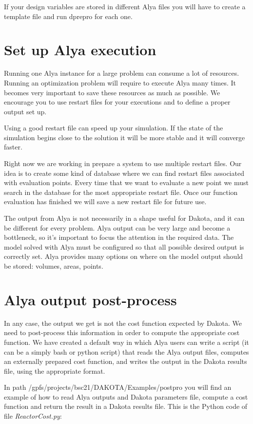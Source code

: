 \documentclass[12pt,a4paper,article]{memoir}
\begin{document}
If your design variables are stored in different Alya files you will have to create a template file and run dprepro for each one.

\section{Set up Alya execution}

Running one Alya instance for a large problem can consume a lot of resources. Running an optimization problem will require to execute Alya many times. It becomes very important to save these resources as much as possible. We encourage you to use restart files for your executions and to define a proper output set up.

Using a good restart file can speed up your simulation. If the state of the simulation begins close to the solution it will be more stable and it will converge faster.

Right now we are working in prepare a system to use multiple restart files. Our idea is to create some kind of database where we can find restart files associated with evaluation points. Every time that we want to evaluate a new point we must search in the database for the most appropriate restart file. Once our function evaluation has finished we will save a new restart file for future use.

The output from Alya is not necessarily in a shape useful for Dakota, and it can be different for every problem. Alya output can be very large and become a bottleneck, so it's important to focus the attention in the required data. The model solved with Alya must be configured so that all possible desired output is correctly set. Alya provides many options on where on the model output should be stored: volumes, areas, points.

\section{Alya output post-process}

In any case, the output we get is not the cost function expected by Dakota. We need to post-process this information in order to compute the appropriate cost function. We have created a default way in which Alya users can write a script (it can be a simply bash or python script) that reads the Alya output files, computes an externally prepared cost function, and writes the output in the Dakota results file, using the appropriate format.

In path /gpfs/projects/bsc21/DAKOTA/Examples/postpro you will find an example of how to read Alya outputs and Dakota parameters file, compute a cost function and return the result in a Dakota results file. This is the Python code of file \textit{ReactorCost.py}:
\end{document}
